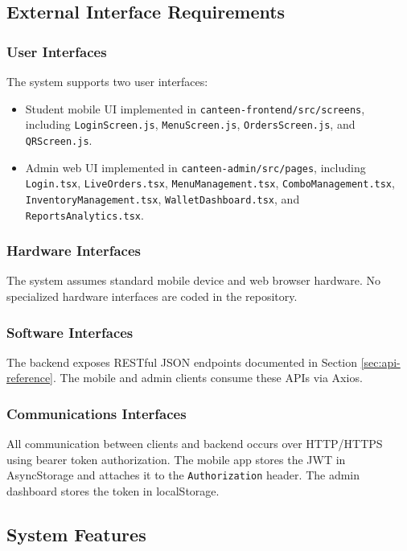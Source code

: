 \documentclass[11pt]{article}
\begin{document}
\subsection{External Interface Requirements}
\subsubsection{User Interfaces}
The system supports two user interfaces:
\begin{itemize}[nosep]
  \item Student mobile UI implemented in \texttt{canteen-frontend/src/screens}, including \texttt{LoginScreen.js}, \texttt{MenuScreen.js}, \texttt{OrdersScreen.js}, and \texttt{QRScreen.js}.
  \item Admin web UI implemented in \texttt{canteen-admin/src/pages}, including \texttt{Login.tsx}, \texttt{LiveOrders.tsx}, \texttt{MenuManagement.tsx}, \texttt{ComboManagement.tsx}, \texttt{InventoryManagement.tsx}, \texttt{WalletDashboard.tsx}, and \texttt{ReportsAnalytics.tsx}.
\end{itemize}

\subsubsection{Hardware Interfaces}
The system assumes standard mobile device and web browser hardware. No specialized hardware interfaces are coded in the repository.

\subsubsection{Software Interfaces}
The backend exposes RESTful JSON endpoints documented in Section \ref{sec:api-reference}. The mobile and admin clients consume these APIs via Axios.

\subsubsection{Communications Interfaces}
All communication between clients and backend occurs over HTTP/HTTPS using bearer token authorization. The mobile app stores the JWT in AsyncStorage and attaches it to the \texttt{Authorization} header. The admin dashboard stores the token in localStorage.

\subsection{System Features}
\end{document}
